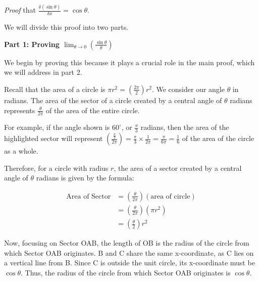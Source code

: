 \documentclass{article}
\begin{document}
\textit{Proof} that $\frac{\delta (\sin \theta)}{\delta x} = \cos \theta$.

We will divide this proof into two parts.

\textbf{Part 1: Proving $\lim_{\theta \to 0}\left( \frac{\sin \theta }{\theta}\right)$}

We begin by proving this because it plays a crucial role in the main proof, which we will address in part 2.

Recall that the area of a circle is $\pi r^2 = \left(\frac{2 \pi}{2}\right)r^2$. We consider our angle $\theta$ in radians. The area of the sector of a circle created by a central angle of $\theta$ radians represents $\frac{\theta}{2\pi}$ of the area of the entire circle.

\begin{minipage}{0.5\textwidth}
For example, if the angle shown is $60^{\circ}$, or $\frac{\pi}{3}$ radians, then the area of the highlighted sector will represent $\left(\frac{\frac{\pi}{3}}{2\pi}\right)=\frac{\pi}{3}\times \frac{1}{2\pi}=\frac{\pi}{6\pi}=\frac{1}{6}$ of the area of the circle as a whole.
\end{minipage}
\hspace{1em}
\begin{minipage}{0.5\textwidth}
\end{minipage}

\hspace{1em}

Therefore, for a circle with radius $r$, the area of a sector created by a central angle of $\theta$ radians is given by the formula:

\begin{align*}
    \text{Area of Sector} &= \left(\frac{\theta}{2 \pi}\right)(\text{area of circle})\\
    &=\left(\frac{\theta}{2 \pi}\right)(\pi r^2)\\
    &=\left(\frac{\theta}{2}\right)r^2
\end{align*}

Now, focusing on Sector OAB, the length of OB is the radius of the circle from which Sector OAB originates. B and C share the same x-coordinate, as C lies on a vertical line from B. Since C is outside the unit circle, its x-coordinate must be $\cos \theta$. Thus, the radius of the circle from which Sector OAB originates is $\cos \theta$.
\end{document}
